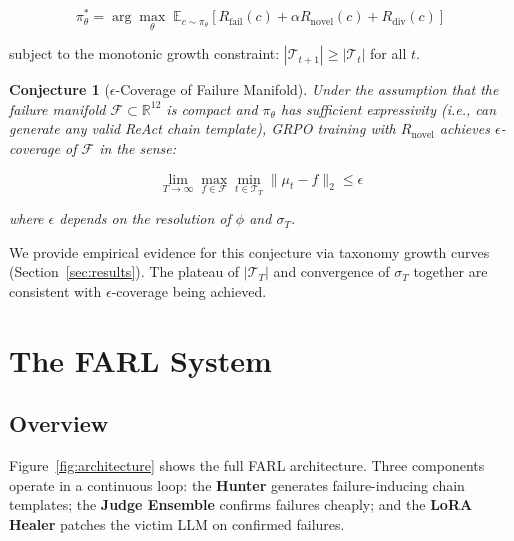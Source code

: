 \documentclass[11pt,a4paper]{article}
\newtheorem{conjecture}{Conjecture}
\begin{document}
\begin{equation}
\pi_\theta^* = \arg\max_\theta \; \mathbb{E}_{c \sim \pi_\theta}
\!\left[R_\text{fail}(c) + \alpha R_\text{novel}(c) + R_\text{div}(c)\right]
\label{eq:objective}
\end{equation}

subject to the monotonic growth constraint:
$|\mathcal{T}_{t+1}| \geq |\mathcal{T}_t|$ for all $t$.

\begin{conjecture}[$\epsilon$-Coverage of Failure Manifold]
\label{conj:coverage}
Under the assumption that the failure manifold $\mathcal{F} \subset
\mathbb{R}^{12}$ is compact and $\pi_\theta$ has sufficient expressivity
(i.e., can generate any valid ReAct chain template), GRPO training with
$R_\text{novel}$ achieves $\epsilon$-coverage of $\mathcal{F}$ in the sense:

$$\lim_{T \to \infty} \max_{f \in \mathcal{F}} \min_{t \in \mathcal{T}_T}
\|\mu_t - f\|_2 \leq \epsilon$$

where $\epsilon$ depends on the resolution of $\phi$ and $\sigma_T$.
\end{conjecture}

We provide empirical evidence for this conjecture via taxonomy growth curves
(Section~\ref{sec:results}). The plateau of $|\mathcal{T}_T|$ and
convergence of $\sigma_T$ together are consistent with $\epsilon$-coverage
being achieved.

\section{The FARL System}
\label{sec:system}

\subsection{Overview}

Figure~\ref{fig:architecture} shows the full FARL architecture. Three
components operate in a continuous loop: the \textbf{Hunter} generates
failure-inducing chain templates; the \textbf{Judge Ensemble} confirms
failures cheaply; and the \textbf{LoRA Healer} patches the victim LLM
on confirmed failures.
\end{document}
